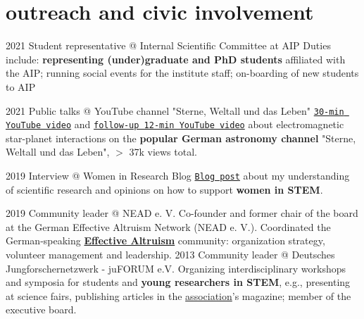 \documentclass[11pt]{k-cv} %
\begin{document}
\section{outreach and civic involvement}
\begin{entrylist}


\entry
{2021 }
{Student representative @ Internal Scientific Committee at AIP}
{}
{Duties include: \textbf{representing (under)graduate and PhD students} affiliated with the AIP; running social events for the institute staff; on-boarding of new students to AIP}


\entry
{2021}
{Public talks @ YouTube channel "Sterne, Weltall und das Leben"}
{}
{\texttt{\href{https://www.youtube.com/watch?v=LLHLobUifeY}{30-min YouTube video}} and \texttt{\href{https://www.youtube.com/watch?v=YRw_tIpspRw}{follow-up 12-min YouTube video}} about electromagnetic star-planet interactions on the \textbf{popular German astronomy channel} "Sterne, Weltall und das Leben", $>$ 37k views total.}

\entry
{2019}
{Interview @ Women in Research Blog}
{}
{\texttt{\href{https://womeninresearchblog.wordpress.com/2019/06/26/ekaterina-germany/}{Blog post}} about my understanding of scientific research and opinions on how to support \textbf{women in STEM}.}

\entry
{2019 }
{Community leader @ NEAD e. V.}
{}
{Co-founder and former chair of the board at the German Effective Altruism Network (NEAD e. V.). Coordinated the German-speaking \href{https://www.effectivealtruism.com/}{\textbf{Effective Altruism}} community: organization strategy, volunteer management and leadership. }
\entry
{2013 }
{Community leader @ Deutsches Jungforschernetzwerk - juFORUM e.V.}
{}
{Organizing interdisciplinary workshops and symposia for students and \textbf{young researchers in STEM}, e.g., presenting at science fairs, publishing articles in the \href{https://www.juforum.de/}{association}'s magazine; member of the executive board.}
\end{entrylist}
\end{document}
